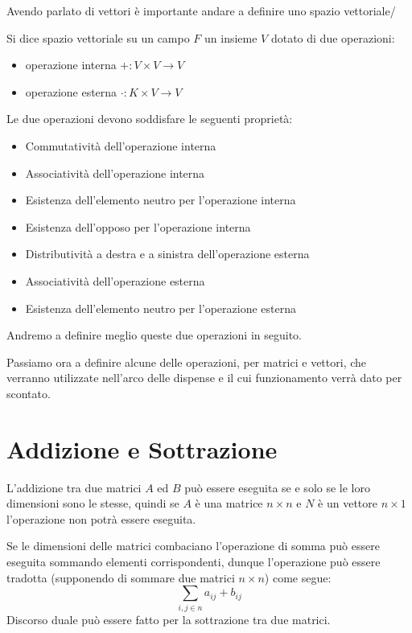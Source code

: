 Avendo parlato di vettori è importante andare a definire uno spazio vettoriale/
\begin{definition}
    Si dice spazio vettoriale su un campo $F$ un insieme $V$ dotato di due operazioni:
    \begin{itemize}
        \item operazione interna $+ : V \times V \rightarrow V$
        \item operazione esterna $\cdot : K \times V \rightarrow V$
    \end{itemize}
    Le due operazioni devono soddisfare le seguenti proprietà:
    \begin{itemize}
        \item Commutatività dell'operazione interna
        \item Associatività dell'operazione interna
        \item Esistenza dell'elemento neutro per l'operazione interna
        \item Esistenza dell'opposo per l'operazione interna
        \item Distributività a destra e a sinistra dell'operazione esterna
        \item Associatività dell'operazione esterna
        \item Esistenza dell'elemento neutro per l'operazione esterna
    \end{itemize}
    Andremo a definire meglio queste due operazioni in seguito.
\end{definition}
Passiamo ora a definire alcune delle operazioni, per matrici e vettori, che verranno utilizzate nell'arco delle dispense e il cui funzionamento verrà dato per scontato.
\section{Addizione e Sottrazione}
L'addizione tra due matrici $A$ ed $B$ può essere eseguita se e solo se le loro dimensioni sono le stesse, quindi se $A$ è una matrice $n \times n$ e $N$ è un vettore $n \times 1$ l'operazione non potrà essere eseguita.

Se le dimensioni delle matrici combaciano l'operazione di somma può essere eseguita sommando elementi corrispondenti, dunque l'operazione può essere tradotta (supponendo di sommare due matrici $n \times n$) come segue:
\begin{equation*}
    \sum_{i, j \in n} a_{ij} + b_{ij}
\end{equation*}
Discorso duale può essere fatto per la sottrazione tra due matrici.
